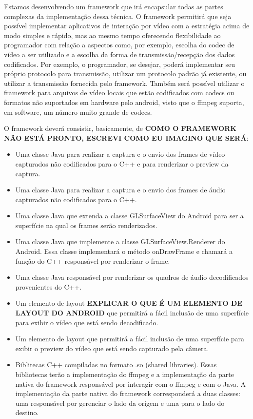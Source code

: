 \documentclass{acm_proc_article-sp}
\newcommand{\todo}[1]{\textcolor[rgb]{1.00,0.00,0.00}{\bf \uppercase{#1}}}
\begin{document}
Estamos desenvolvendo um framework que irá encapsular todas as partes complexas da implementação dessa técnica. O framework permitirá que seja possível implementar aplicativos de interação por vídeo com a estratégia acima de modo simples e rápido, mas ao mesmo tempo oferecendo flexibilidade ao programador com relação a aspectos como, por exemplo, escolha do codec de vídeo a ser utilizado e a escolha da forma de transmissão/recepção dos dados codificados. Por exemplo, o programador, se desejar, poderá implementar seu próprio protocolo para transmissão, utilizar um protocolo padrão já existente, ou utilizar a transmissão fornecida pelo framework. Também será possível utilizar o framework para arquivos de vídeo locais que estão codificados com codecs ou formatos não suportados em hardware pelo android, visto que o ffmpeg suporta, em software, um número muito grande de codecs.

O framework deverá consistir, basicamente, de \todo{como o framework não está pronto, escrevi como eu imagino que será}:

\begin{itemize}
 \item Uma classe Java para realizar a captura e o envio dos frames de vídeo capturados não codificados para o C++ e para renderizar o preview da captura.
 \item Uma classe Java para realizar a captura e o envio dos frames de áudio capturados não codificados para o C++.
 \item Uma classe Java que extenda a classe GLSurfaceView do Android para ser a superfície na qual os frames serão renderizados.
 \item Uma classe Java que implemente a classe GLSurfaceView.Renderer do Android. Essa classe implementará o método onDrawFrame e chamará a função do C++ responsável por renderizar o frame.
 \item Uma classe Java responsável por renderizar os quadros de áudio decodificados provenientes do C++.
 \item Um elemento de layout \todo{explicar o que é um elemento de layout do android} que permitirá a fácil inclusão de uma superfície para exibir o vídeo que está sendo decodificado.
 \item Um elemento de layout que permitirá a fácil inclusão de uma superfície para exibir o preview do vídeo que está sendo capturado pela câmera.
 \item Biblitecas C++ compiladas no formato .so (shared libraries). Essas bibliotecas terão a implementação do ffmpeg e a implementação da parte nativa do framework responsável por interagir com o ffmpeg e com o Java. A implementação da parte nativa do framework corresponderá a duas classes: uma responsável por gerenciar o lado da origem e uma para o lado do destino.
\end{itemize}
\end{document}
